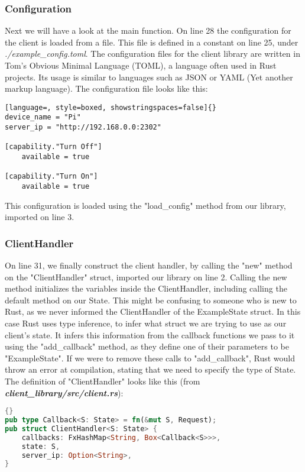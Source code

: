 \subsubsection{Configuration}
Next we will have a look at the main function. On line 28 the configuration for the client is loaded from a file. This file is defined in a constant on line 25, under \textit{./example\_config.toml}. The configuration files for the client library are written in Tom's Obvious Minimal Language (TOML), a language often used in Rust projects. Its usage is similar to languages such as JSON or YAML (Yet another markup language). The configuration file looks like this:

\begin{lstlisting}[language=, style=boxed, showstringspaces=false]{}
device_name = "Pi"
server_ip = "http://192.168.0.0:2302"

[capability."Turn Off"]
    available = true

[capability."Turn On"]
    available = true
\end{lstlisting}
This configuration is loaded using the "load\_config" method from our library, imported on line 3. 
\subsubsection{ClientHandler}
On line 31, we finally construct the client handler, by calling the "new" method on the "ClientHandler" struct, imported our library on line 2. Calling the new method initializes the variables inside the ClientHandler, including calling the default method on our State. This might be confusing to someone who is new to Rust, as we never informed the ClientHandler of the ExampleState struct. In this case Rust uses type inference, to infer what struct we are trying to use as our client's state. It infers this information from the callback functions we pass to it using the "add\_callback" method, as they define one of their parameters to be "ExampleState". If we were to remove these calls to "add\_callback", Rust would throw an error at compilation, stating that we need to specify the type of State. The definition of "ClientHandler" looks like this (from \textit{\textbf{client\_library/src/client.rs}}):
\begin{lstlisting}[language=Rust, style=boxed, showstringspaces=false]{}
pub type Callback<S: State> = fn(&mut S, Request);
pub struct ClientHandler<S: State> {
    callbacks: FxHashMap<String, Box<Callback<S>>>,
    state: S,
    server_ip: Option<String>,
}
\end{lstlisting}

